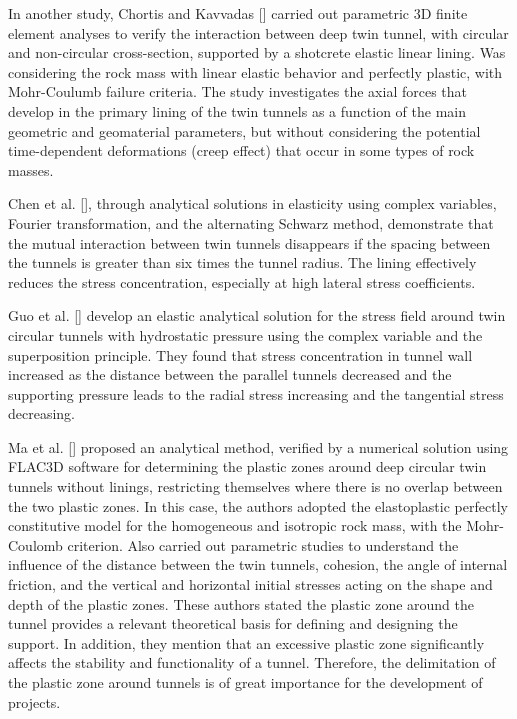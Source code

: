 \documentclass[a4paper,fleqn]{cas-sc}
\begin{document}
In another study, Chortis and Kavvadas [] carried out parametric 3D finite element analyses to verify the interaction between deep twin tunnel, with circular and non-circular cross-section, supported by a shotcrete elastic linear lining. Was considering the rock mass with linear elastic behavior and perfectly plastic, with Mohr-Coulumb failure criteria. The study investigates the axial forces that develop in the primary lining of the twin tunnels as a function of the main geometric and geomaterial parameters, but without considering the potential time-dependent deformations (creep effect) that occur in some types of rock masses.

Chen et al. [], through analytical solutions in elasticity using complex variables, Fourier transformation, and the alternating Schwarz method, demonstrate that the mutual interaction between twin tunnels disappears if the spacing between the tunnels is greater than six times the tunnel radius. The lining effectively reduces the stress concentration, especially at high lateral stress coefficients.

Guo et al. [] develop an elastic analytical solution for the stress field around twin circular tunnels with hydrostatic pressure using the complex variable and the superposition principle. They found that stress concentration in tunnel wall increased as the distance between the parallel tunnels decreased and the supporting pressure leads to the radial stress increasing and the tangential stress decreasing.

Ma et al. [] proposed an analytical method, verified by a numerical solution using FLAC3D software for determining the plastic zones around deep circular twin tunnels without linings, restricting themselves where there is no overlap between the two plastic zones. In this case, the authors adopted the elastoplastic perfectly constitutive model for the homogeneous and isotropic rock mass, with the Mohr-Coulomb criterion. Also carried out parametric studies to understand the influence of the distance between the twin tunnels, cohesion, the angle of internal friction, and the vertical and horizontal initial stresses acting on the shape and depth of the plastic zones. These authors stated the plastic zone around the tunnel provides a relevant theoretical basis for defining and designing the support. In addition, they mention that an excessive plastic zone significantly affects the stability and functionality of a tunnel. Therefore, the delimitation of the plastic zone around tunnels is of great importance for the development of projects.
\end{document}
